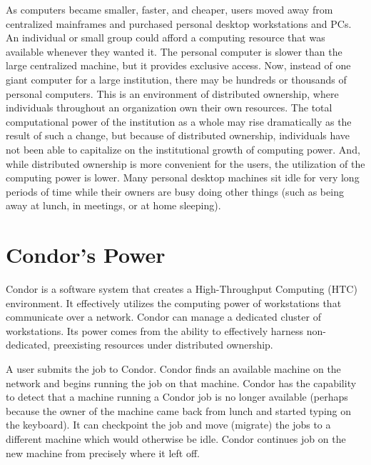 As computers became smaller, faster, and cheaper, 
users moved away from centralized mainframes and purchased personal desktop
workstations and PCs.
An individual or small group could afford a
computing resource that was available whenever they wanted it.
The personal computer is slower than the large centralized machine,
but it provides exclusive access.
Now, instead of one giant computer for a large institution,
there may be hundreds or thousands of personal computers.
This is an environment of distributed ownership,
where individuals throughout an organization own their own resources.
The total computational power of the institution as a whole may rise
dramatically as the result of such a change,
but because of distributed ownership,
individuals have not been able to capitalize on the institutional growth of
computing power.
And, while distributed ownership is more convenient for the users,
the utilization of the computing power is lower.
Many personal desktop
machines sit idle for very long periods of time while their owners are
busy doing other things (such as being away at lunch, in meetings,
or at home sleeping). 

\section{\label{sec:what-is-condor}Condor's Power}

Condor is a software system that creates a High-Throughput Computing
(HTC) environment.
It effectively utilizes the computing power of workstations that
communicate over a network.
Condor can manage a dedicated cluster of workstations.
Its power comes from the
ability to effectively harness non-dedicated,
preexisting resources under distributed ownership. 

A user submits the job to Condor.
Condor finds an available machine on the network and begins
running the job on that machine.
Condor has the capability to detect that a machine running a Condor job
is no longer available (perhaps because the owner of the machine
came back from lunch and started typing on the keyboard).
It can checkpoint 
the job and move (migrate)
the jobs to a different machine which would otherwise be idle.
Condor continues job on the new machine from
precisely where it left off.

